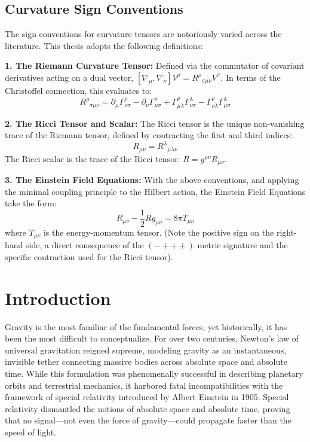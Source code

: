 \documentclass[11pt, a4paper]{report}
\begin{document}
\section*{Curvature Sign Conventions}
The sign conventions for curvature tensors are notoriously varied across the literature. This thesis adopts the following definitions:

\textbf{1. The Riemann Curvature Tensor:}
Defined via the commutator of covariant derivatives acting on a dual vector, $[\nabla_\mu, \nabla_\nu] V^\rho = {R^\rho}_{\sigma\mu\nu} V^\sigma$. In terms of the Christoffel connection, this evaluates to:
\begin{equation}
{R^\rho}_{\sigma\mu\nu} = \partial_{\mu}\Gamma^{\rho}_{\nu\sigma} - \partial_{\nu}\Gamma^{\rho}_{\mu\sigma} + \Gamma^{\rho}_{\mu\lambda}\Gamma^{\lambda}_{\nu\sigma} - \Gamma^{\rho}_{\nu\lambda}\Gamma^{\lambda}_{\mu\sigma}
\end{equation}

\textbf{2. The Ricci Tensor and Scalar:}
The Ricci tensor is the unique non-vanishing trace of the Riemann tensor, defined by contracting the first and third indices:
\begin{equation}
R_{\mu\nu} = {R^\lambda}_{\mu\lambda\nu}
\end{equation}
The Ricci scalar is the trace of the Ricci tensor: $R = g^{\mu\nu}R_{\mu\nu}$.

\textbf{3. The Einstein Field Equations:}
With the above conventions, and applying the minimal coupling principle to the Hilbert action, the Einstein Field Equations take the form:
\begin{equation}
R_{\mu\nu} - \frac{1}{2}R g_{\mu\nu} = 8\pi T_{\mu\nu}
\end{equation}
where $T_{\mu\nu}$ is the energy-momentum tensor. (Note the positive sign on the right-hand side, a direct consequence of the $(- + + +)$ metric signature and the specific contraction used for the Ricci tensor).



\chapter{Introduction}

Gravity is the most familiar of the fundamental forces, yet historically, it has been the most difficult to conceptualize. For over two centuries, Newton's law of universal gravitation reigned supreme, modeling gravity as an instantaneous, invisible tether connecting massive bodies across absolute space and absolute time. While this formulation was phenomenally successful in describing planetary orbits and terrestrial mechanics, it harbored fatal incompatibilities with the framework of special relativity introduced by Albert Einstein in 1905. Special relativity dismantled the notions of absolute space and absolute time, proving that no signal—not even the force of gravity—could propagate faster than the speed of light.
\newline
\end{document}
